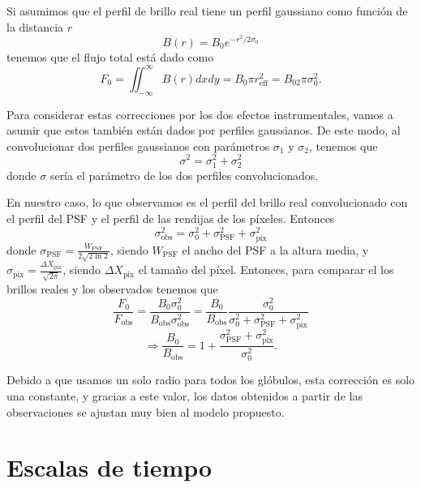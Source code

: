 \documentclass{book}
\begin{document}
Si asumimos que el perfil de brillo real tiene un perfil gaussiano como función de la distancia $r$ 
\begin{equation}
B(r)= B_0 e^{-r^2/2\sigma_0}
\end{equation} 
tenemos que el flujo total está dado como 
\begin{equation}
F_0=\iint_{-\infty}^\infty B(r)dxdy=B_0 \pi r_\mathrm{eff}^2=B_02\pi \sigma_0^2.
\end{equation}

Para considerar estas correcciones por los dos efectos instrumentales, vamos a asumir que estos también están dados por perfiles gaussianos. De este modo, al convolucionar dos perfiles gaussianos con parámetros $\sigma_1$ y $\sigma_2$, tenemos que 
\begin{equation}
\sigma^2=\sigma_1^2+\sigma_2^2
\end{equation}
donde $\sigma$ sería el parámetro de los dos perfiles convolucionados.

En nuestro caso, lo que observamos es el perfil del brillo real convolucionado con el perfil del PSF y el perfil de las rendijas de los píxeles. Entonces 
\begin{equation}
\sigma_\mathrm{obs}^2=\sigma_0^2+\sigma_\mathrm{PSF}^2+\sigma_\mathrm{pix}^2
\end{equation}
donde $\sigma_\mathrm{PSF}=\frac{W_\mathrm{PSF}}{2\sqrt{2\ln{2}}}$, siendo $W_\mathrm{PSF}$ el ancho del PSF a la altura media, y $\sigma_\mathrm{pix}=\frac{\Delta X_\mathrm{pix}}{\sqrt{2\pi}}$, siendo $\Delta X_\mathrm{pix}$ el tamaño del píxel. Entonces, para comparar el los brillos reales y los observados tenemos que
\begin{equation}
\frac{F_0}{F_\mathrm{obs}}=\frac{B_0\sigma_0^2}{B_\mathrm{obs}\sigma_\mathrm{obs}^2}=\frac{B_0}{B_\mathrm{obs}}\frac{\sigma_0^2}{\sigma_0^2+\sigma_\mathrm{PSF}^2+\sigma_\mathrm{pix}^2}
\end{equation} 
\begin{equation}
\Rightarrow \frac{B_0}{B_\mathrm{obs}}=1+\frac{\sigma_\mathrm{PSF}^2+\sigma_\mathrm{pix}^2}{\sigma_0^2}.
\end{equation}

Debido a que usamos un solo radio para todos los glóbulos, esta corrección es solo una constante, y gracias a este valor, los datos obtenidos a partir de las observaciones se ajustan muy bien al modelo propuesto.


\chapter{Escalas de tiempo}
\end{document}
